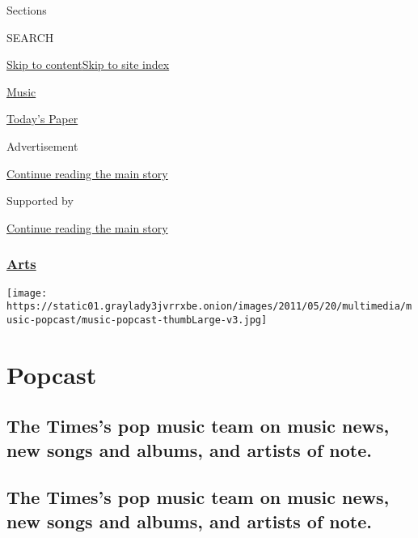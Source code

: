Sections

SEARCH

\protect\hyperlink{site-content}{Skip to
content}\protect\hyperlink{site-index}{Skip to site index}

\href{https://www.nytimes3xbfgragh.onion/section/arts/music}{Music}

\href{https://myaccount.nytimes3xbfgragh.onion/auth/login?response_type=cookie\&client_id=vi}{}

\href{https://www.nytimes3xbfgragh.onion/section/todayspaper}{Today's
Paper}

Advertisement

\protect\hyperlink{after-top}{Continue reading the main story}

Supported by

\protect\hyperlink{after-sponsor}{Continue reading the main story}

\hypertarget{arts}{%
\subsubsection{\texorpdfstring{\href{/section/arts}{Arts}}{Arts}}\label{arts}}

\texttt{[image: https://static01.graylady3jvrrxbe.onion/images/2011/05/20/multimedia/music-popcast/music-popcast-thumbLarge-v3.jpg]}

\hypertarget{popcast}{%
\section{Popcast}\label{popcast}}

\hypertarget{the-timess-pop-music-team-on-music-news-new-songs-and-albums-and-artists-of-note}{%
\subsection{The Times's pop music team on music news, new songs and
albums, and artists of
note.}\label{the-timess-pop-music-team-on-music-news-new-songs-and-albums-and-artists-of-note}}

\hypertarget{the-timess-pop-music-team-on-music-news-new-songs-and-albums-and-artists-of-note-1}{%
\subsection{The Times's pop music team on music news, new songs and
albums, and artists of
note.}\label{the-timess-pop-music-team-on-music-news-new-songs-and-albums-and-artists-of-note-1}}

